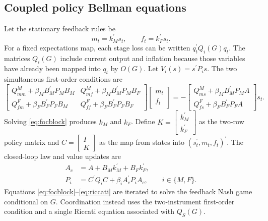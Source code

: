 \documentclass[11pt]{article}
\newcommand{\trans}{^{\prime}}
\begin{document}
\subsection{Coupled policy Bellman equations}

Let the stationary feedback rules be
\begin{equation}
m_t=k_M\trans s_t,\qquad f_t=k_F\trans s_t.                \label{eq:rules}
\end{equation}
For a fixed expectations map, each stage loss can be written $q_t\trans
Q_i(G)q_t$. The matrices $Q_i(G)$ include current output and inflation because
those variables have already been mapped into $q_t$ by $O(G)$. Let
$V_i(s)=s\trans P_i s$. The two simultaneous first-order conditions are
\begin{equation}
\begin{bmatrix}
Q^M_{mm}+\beta_M B_M\trans P_MB_M &
Q^M_{mf}+\beta_M B_M\trans P_MB_F\\
Q^F_{fm}+\beta_F B_F\trans P_FB_M &
Q^F_{ff}+\beta_F B_F\trans P_FB_F
\end{bmatrix}
\begin{bmatrix}m_t\\f_t\end{bmatrix}
=-
\begin{bmatrix}
Q^M_{ms}+\beta_M B_M\trans P_MA\\
Q^F_{fs}+\beta_F B_F\trans P_FA
\end{bmatrix}s_t.                                        \label{eq:focblock}
\end{equation}
Solving \eqref{eq:focblock} produces $k_M$ and $k_F$. Define
$K=\begin{bmatrix}k_M\trans\\k_F\trans\end{bmatrix}$ as the two-row policy
matrix and $C=\begin{bmatrix}I\\K\end{bmatrix}$ as the map from states into
$(s_t\trans,m_t,f_t)\trans$. The closed-loop law and value updates are
\begin{align}
A_c&=A+B_Mk_M\trans+B_Fk_F\trans,                         \label{eq:Acl}\\
P_i&=C\trans Q_i C+\beta_i A_c\trans P_iA_c,
\qquad i\in\{M,F\}.                                      \label{eq:riccati}
\end{align}
Equations \eqref{eq:focblock}--\eqref{eq:riccati} are iterated to solve the
feedback Nash game conditional on $G$. Coordination instead uses the
two-instrument first-order condition and a single Riccati equation associated
with $Q_S(G)$.
\end{document}
